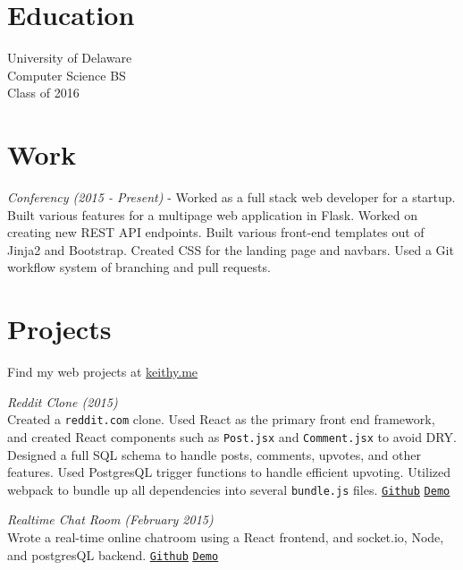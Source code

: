 \documentclass[margin]{res}
\begin{document}

\address{{\bf Address}\\346 Nicholas Ct \\Wilmington, DE 19808\\(302) 887-0387}
\address{{\bf Links}\\\url{terda12@gmail.com}\\\url{github.com/keithyong}\\\url{keithy.me}}

\begin{resume}

\section{Education}
University of Delaware\\
Computer Science BS\\
Class of 2016\\

\section{Work}
\textit{Conferency (2015 - Present)} - Worked as a full stack web developer for a startup. Built various features for a multipage web application in Flask. Worked on creating new REST API endpoints. Built various front-end templates out of Jinja2 and Bootstrap. Created CSS for the landing page and navbars. Used a Git workflow system of branching and pull requests.

\section{Projects}

Find my web projects at \url{keithy.me}

\textit{Reddit Clone (2015)}\\ Created a \texttt{reddit.com} clone. Used React as the primary front end framework, and created React components such as \texttt{Post.jsx} and \texttt{Comment.jsx} to avoid DRY. Designed a full SQL schema to handle posts, comments, upvotes, and other features. Used PostgresQL trigger functions to handle efficient upvoting. Utilized webpack to bundle up all dependencies into several \texttt{bundle.js} files. \underline{\texttt{\href{https://github.com/keithyong/pyramus}{Github}}} \underline{\texttt{\href{http://pyramus.keithy.me}{Demo}}}

\textit{Realtime Chat Room (February 2015)}\\ Wrote a real-time online chatroom using a React frontend, and socket.io, Node, and postgresQL backend. \underline{\texttt{\href{https://github.com/keithyong/chat-room}{Github}}} \underline{\texttt{\href{http://chatter.keithy.me}{Demo}}}


\end{resume}
\end{document}
